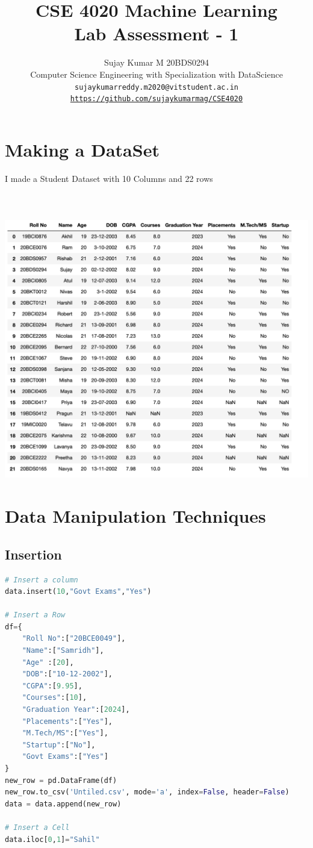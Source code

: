 \documentclass{article}
\title{CSE 4020 Machine Learning \\ Lab Assessment - 1  }
\author{Sujay Kumar M 20BDS0294\\ \small Computer Science Engineering with Specialization with DataScience\\ \tt sujaykumarreddy.m2020@vitstudent.ac.in
\\ \url{https://github.com/sujaykumarmag/CSE4020}}
\begin{document}
\maketitle
\section{Making a DataSet}
I made a Student Dataset with 10 Columns and 22 rows \\\\\\\
\includegraphics[scale=0.63]{images/one.png}

\section{Data Manipulation Techniques}
\subsection{Insertion}
\begin{lstlisting}[language=Python]
# Insert a column
data.insert(10,"Govt Exams","Yes")

# Insert a Row
df={
    "Roll No":["20BCE0049"],
    "Name":["Samridh"],
    "Age" :[20],
    "DOB":["10-12-2002"],
    "CGPA":[9.95],
    "Courses":[10],
    "Graduation Year":[2024],
    "Placements":["Yes"],
    "M.Tech/MS":["Yes"],
    "Startup":["No"],
    "Govt Exams":["Yes"]
}
new_row = pd.DataFrame(df)
new_row.to_csv('Untiled.csv', mode='a', index=False, header=False)
data = data.append(new_row)

# Insert a Cell
data.iloc[0,1]="Sahil"

\end{lstlisting}
\end{document}
